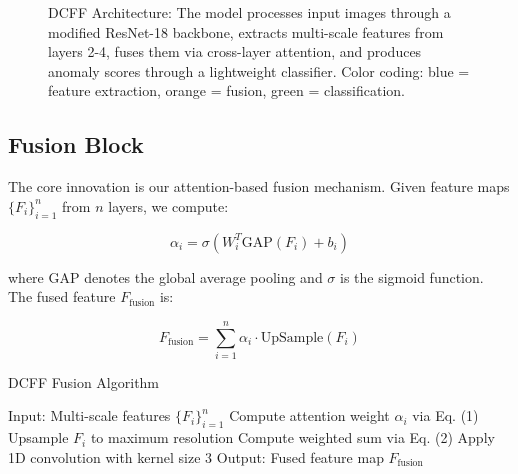 \documentclass[conference]{IEEEtran}
\begin{document}
\begin{figure}[t!]
\caption{DCFF Architecture: The model processes input images through a modified ResNet-18 backbone, extracts multi-scale features from layers 2-4, fuses them via cross-layer attention, and produces anomaly scores through a lightweight classifier. Color coding: blue = feature extraction, orange = fusion, green = classification.}
\label{fig:architecture}
\end{figure}

\subsection{Fusion Block}
The core innovation is our attention-based fusion mechanism. Given feature maps $\{F_i\}_{i=1}^n$ from $n$ layers, we compute:

\begin{equation}
\alpha_i = \sigma(W_i^T \text{GAP}(F_i) + b_i)
\end{equation}

where GAP denotes the global average pooling and $\sigma$ is the sigmoid function. The fused feature $F_{\text{fusion}}$ is:

\begin{equation}
F_{\text{fusion}} = \sum_{i=1}^n \alpha_i \cdot \text{UpSample}(F_i)
\end{equation}

\begin{algorithm}[htbp]
\caption{DCFF Fusion Algorithm}
\begin{algorithmic}[1]
\State Input: Multi-scale features $\{F_i\}_{i=1}^n$
\State Compute attention weight $\alpha_i$ via Eq. (1)
\State Upsample $F_i$ to maximum resolution
\EndFor
\State Compute weighted sum via Eq. (2)
\State Apply 1D convolution with kernel size 3
\State Output: Fused feature map $F_{\text{fusion}}$
\end{algorithmic}
\end{algorithm}
\end{document}
